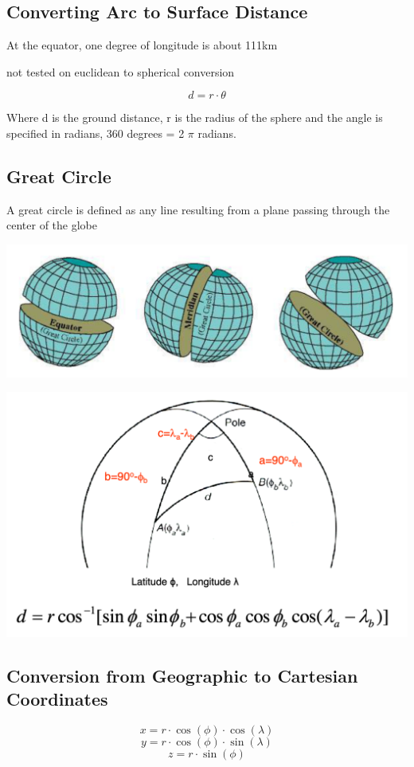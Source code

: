 \documentclass[11pt]{article}
\theoremstyle{definition}
\begin{document}
\subsection{Converting Arc to Surface
Distance}
At the equator, one degree
of longitude is about 111km

not tested on euclidean to spherical conversion

\begin{equation}
    d = r \cdot \theta
\end{equation}

Where d is the ground distance, r is the
radius of the sphere and the angle is
specified in radians, 360 degrees = 2 $\pi$ radians.

\subsection{Great Circle}
A great circle is defined as any line resulting from a
plane passing through the center of the globe

\includegraphics[width=\textwidth/2]{13.png}

\includegraphics[width=\textwidth/2]{14.png}

\subsection{Conversion from Geographic to
Cartesian Coordinates}
\begin{equation}
    x = r \cdot \cos(\phi) \cdot \cos(\lambda)
\end{equation}
\begin{equation}
    y = r \cdot \cos(\phi) \cdot \sin(\lambda)
\end{equation}
\begin{equation}
    z = r \cdot \sin(\phi)
\end{equation}
\end{document}
